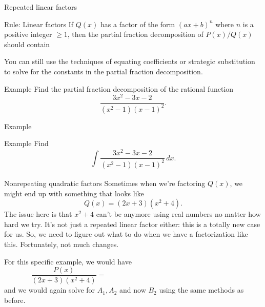 \documentclass[presentation]{beamer}
\begin{document}
\begin{frame}[label={sec:org7c5f300}]{Repeated linear factors}
\begin{block}{Rule: Linear factors}
If \(Q(x)\) has a factor of the form \((ax + b)^n\) where \(n\) is
a positive integer \(\ge 1\), then the partial fraction decomposition
of \(P(x)/Q(x)\) should contain
\[
\hspace{1in} \]
\phantom{butts}
\end{block}

You can still use the techniques of equating coefficients or strategic
substitution to solve for the constants in the partial fraction
decomposition.
\end{frame}

\begin{frame}[label={sec:org9edd409}]{Example}
Find the partial fraction decomposition of the rational function
\[
\frac{3x^2-3x-2}{\left( x^2-1 \right)\left( x-1 \right)^2}. \]
\vspace{10in}
\end{frame}

\begin{frame}[label={sec:orga30cc60}]{Example}
\end{frame}

\begin{frame}[label={sec:org4795f08}]{Example}
Find
\[
\int\limits_{}^{}\frac{3x^2-3x-2}{\left( x^2-1 \right)\left( x-1
\right)^2}\,dx. \]
\vspace{10in}
\end{frame}

\begin{frame}[label={sec:org379420a}]{Nonrepeating quadratic factors}
Sometimes when we're factoring \(Q(x)\), we might end up with
something that looks like
\[
Q(x) = \left( 2x+3 \right) \left( x^2 + 4 \right). \]
The issue here is that \(x^2+4\) can't be \uline{\hspace*{1in}} anymore using real
numbers no matter how hard we try.  It's not just a repeated linear
factor either: this is a totally new case for us.  
So, we need to figure out what to do when we have a factorization like
this. Fortunately, not much changes. 

For this specific example, we would have
\[
\frac{P(x)}{\left( 2x+3 \right)\left( x^2+4 \right)} =
\hspace{3in} \]
and we would again solve for \(A_1,A_2\) and now \(B_2\) using the
same methods as before.
\end{frame}
\end{document}
